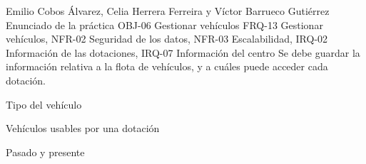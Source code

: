 {Emilio Cobos Álvarez, Celia Herrera Ferreira y Víctor Barrueco Gutiérrez}
{Enunciado de la práctica}
{OBJ-06 Gestionar vehículos}
{FRQ-13 Gestionar vehículos, NFR-02 Seguridad de los datos, NFR-03 Escalabilidad, IRQ-02 Información de las dotaciones, IRQ-07 Información del centro}
{Se debe guardar la información relativa a la flota de vehículos, y a cuáles puede acceder cada dotación.}
{
\item{Tipo del vehículo}
\item{Vehículos usables por una dotación}
}
{Pasado y presente}

